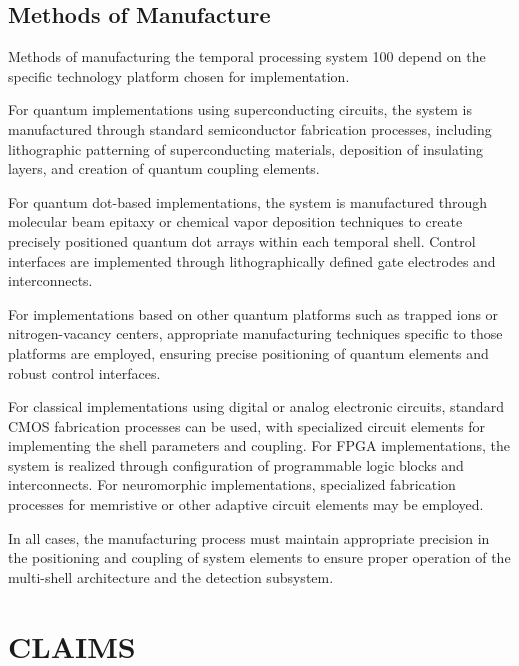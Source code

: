 \documentclass[12pt,letterpaper]{article}
\begin{document}
\subsection{Methods of Manufacture}

Methods of manufacturing the temporal processing system 100 depend on the specific technology platform chosen for implementation. 

For quantum implementations using superconducting circuits, the system is manufactured through standard semiconductor fabrication processes, including lithographic patterning of superconducting materials, deposition of insulating layers, and creation of quantum coupling elements.

For quantum dot-based implementations, the system is manufactured through molecular beam epitaxy or chemical vapor deposition techniques to create precisely positioned quantum dot arrays within each temporal shell. Control interfaces are implemented through lithographically defined gate electrodes and interconnects.

For implementations based on other quantum platforms such as trapped ions or nitrogen-vacancy centers, appropriate manufacturing techniques specific to those platforms are employed, ensuring precise positioning of quantum elements and robust control interfaces.

For classical implementations using digital or analog electronic circuits, standard CMOS fabrication processes can be used, with specialized circuit elements for implementing the shell parameters and coupling. For FPGA implementations, the system is realized through configuration of programmable logic blocks and interconnects. For neuromorphic implementations, specialized fabrication processes for memristive or other adaptive circuit elements may be employed.

In all cases, the manufacturing process must maintain appropriate precision in the positioning and coupling of system elements to ensure proper operation of the multi-shell architecture and the detection subsystem.

\newpage
\section*{CLAIMS}
\end{document}
